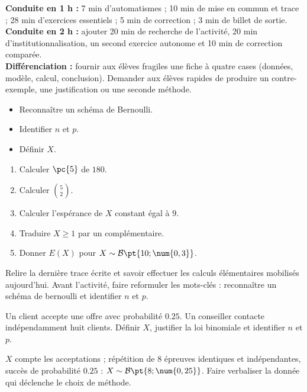 \ifmxteacher
\begin{method}
\textbf{Conduite en 1 h :} 7 min d'automatismes ; 10 min de mise en commun et trace ; 28 min d'exercices essentiels ; 5 min de correction ; 3 min de billet de sortie.\\
\textbf{Conduite en 2 h :} ajouter 20 min de recherche de l'activité, 20 min d'institutionnalisation, un second exercice autonome et 10 min de correction comparée.\\
\textbf{Différenciation :} fournir aux élèves fragiles une fiche à quatre cases (données, modèle, calcul, conclusion). Demander aux élèves rapides de produire un contre-exemple, une justification ou une seconde méthode.
\end{method}
\fi
{}
\begin{objectives}\begin{itemize}\item Reconnaître un schéma de Bernoulli.\item Identifier $n$ et $p$.\item Définir $X$.\end{itemize}\end{objectives}
\begin{fluency}\begin{enumerate}\item Calculer $\pc{5}$ de $180$. \item Calculer $\binom52$. \item Calculer l'espérance de $X$ constant égal à $9$. \item Traduire $X\geq1$ par un complémentaire. \item Donner $E(X)$ pour $X\sim\mathcal B\pt{10;\num{0,3}}$. \end{enumerate}\end{fluency}
\begin{prerequisites}Relire la dernière trace écrite et savoir effectuer les calculs élémentaires mobilisés aujourd'hui. Avant l'activité, faire reformuler les mots-clés : reconnaître un schéma de bernoulli et identifier $n$ et $p$.\end{prerequisites}

\begin{activity}
Un client accepte une offre avec probabilité $\num{0,25}$. Un conseiller contacte indépendamment huit clients. Définir $X$, justifier la loi binomiale et identifier $n$ et $p$.

\end{activity}
\begin{solution}$X$ compte les acceptations ; répétition de 8 épreuves identiques et indépendantes, succès de probabilité $\num{0,25}$ : $X\sim\mathcal B\pt{8;\num{0,25}}$. Faire verbaliser la donnée qui déclenche le choix de méthode.\end{solution}

